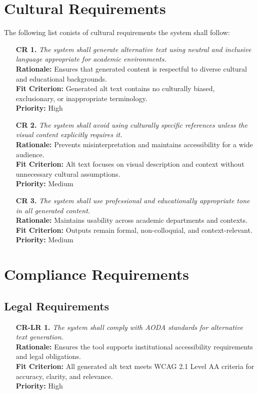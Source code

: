 \documentclass[12pt]{article}
\begin{document}
\section{Cultural Requirements}
The following list conists of cultural requirements the system shall follow:
\begin{itemize}
  \item[\textbf{CR 1.}] \textit{The system shall generate alternative
      text using neutral and inclusive language appropriate for
    academic environments.}\\
    \textbf{Rationale:} Ensures that generated content is respectful
    to diverse cultural and educational backgrounds.\\
    \textbf{Fit Criterion:} Generated alt text contains no culturally
    biased, exclusionary, or inappropriate terminology.\\
    \textbf{Priority:} High

  \item[\textbf{CR 2.}] \textit{The system shall avoid using
      culturally specific references unless the visual content
    explicitly requires it.}\\
    \textbf{Rationale:} Prevents misinterpretation and maintains
    accessibility for a wide audience.\\
    \textbf{Fit Criterion:} Alt text focuses on visual description
    and context without unnecessary cultural assumptions.\\
    \textbf{Priority:} Medium

  \item[\textbf{CR 3.}] \textit{The system shall use professional and
    educationally appropriate tone in all generated content.}\\
    \textbf{Rationale:} Maintains usability across academic
    departments and contexts.\\
    \textbf{Fit Criterion:} Outputs remain formal, non-colloquial,
    and context-relevant.\\
    \textbf{Priority:} Medium
\end{itemize}

\section{Compliance Requirements}
\subsection{Legal Requirements}
\begin{itemize}
  \item[\textbf{CR-LR 1.}] \textit{The system shall comply with AODA
    standards for alternative text generation.}\\
    \textbf{Rationale:} Ensures the tool supports institutional
    accessibility requirements and legal obligations.\\
    \textbf{Fit Criterion:} All generated alt text meets WCAG 2.1
    Level AA criteria for accuracy, clarity, and relevance.\\
    \textbf{Priority:} High
\end{itemize}
\end{document}
